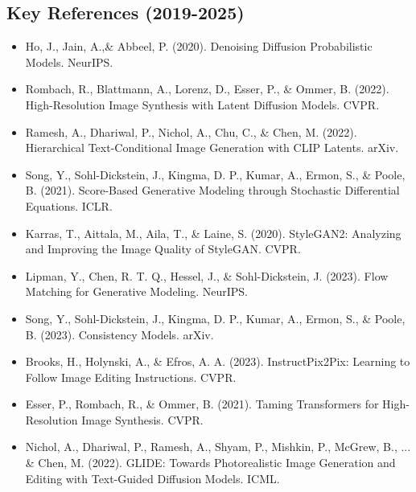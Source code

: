 \subsection*{Key References (2019-2025)}
\begin{itemize}
    \item Ho, J., Jain, A.,\& Abbeel, P. (2020). Denoising Diffusion Probabilistic Models. NeurIPS.
    \item Rombach, R., Blattmann, A., Lorenz, D., Esser, P., \& Ommer, B. (2022). High-Resolution Image Synthesis with Latent Diffusion Models. CVPR.
    \item Ramesh, A., Dhariwal, P., Nichol, A., Chu, C., \& Chen, M. (2022). Hierarchical Text-Conditional Image Generation with CLIP Latents. arXiv.
    \item Song, Y., Sohl-Dickstein, J., Kingma, D. P., Kumar, A., Ermon, S., \& Poole, B. (2021). Score-Based Generative Modeling through Stochastic Differential Equations. ICLR.
    \item Karras, T., Aittala, M., Aila, T., \& Laine, S. (2020). StyleGAN2: Analyzing and Improving the Image Quality of StyleGAN. CVPR.
    \item Lipman, Y., Chen, R. T. Q., Hessel, J., \& Sohl-Dickstein, J. (2023). Flow Matching for Generative Modeling. NeurIPS.
    \item Song, Y., Sohl-Dickstein, J., Kingma, D. P., Kumar, A., Ermon, S., \& Poole, B. (2023). Consistency Models. arXiv.
    \item Brooks, H., Holynski, A., \& Efros, A. A. (2023). InstructPix2Pix: Learning to Follow Image Editing Instructions. CVPR.
    \item Esser, P., Rombach, R., \& Ommer, B. (2021). Taming Transformers for High-Resolution Image Synthesis. CVPR.
    \item Nichol, A., Dhariwal, P., Ramesh, A., Shyam, P., Mishkin, P., McGrew, B., ... \& Chen, M. (2022). GLIDE: Towards Photorealistic Image Generation and Editing with Text-Guided Diffusion Models. ICML.
\end{itemize}

